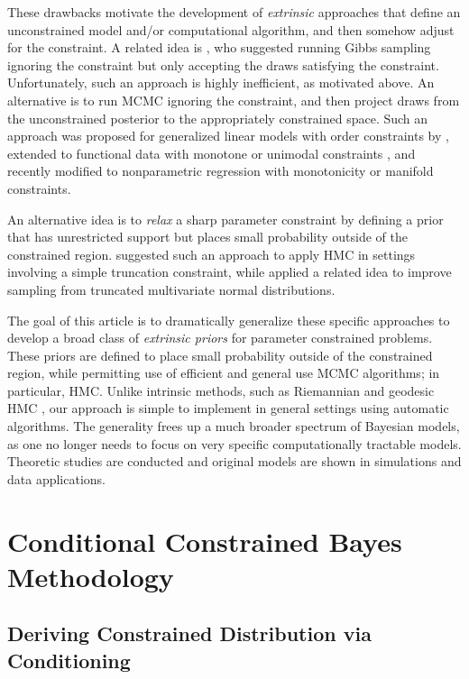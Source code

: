 \documentclass[10pt]{article}
\DeclareMathOperator{\1}{\mathbbm{1}}
\begin{document}
These drawbacks motivate the development of {\em extrinsic} approaches that define an unconstrained model and/or computational algorithm, and then somehow adjust for the constraint. A related idea is \cite{gelfand1992bayesian}, who suggested running Gibbs sampling ignoring the constraint but only accepting the draws satisfying the constraint. Unfortunately, such an approach is highly inefficient, as motivated above. An alternative is to run MCMC ignoring the constraint, and then project draws from the unconstrained posterior to the appropriately constrained space. Such an approach was proposed for generalized linear models with order constraints by \cite{dunson2003bayesian}, extended to functional data with monotone or unimodal constraints \citep{gunn2005transformation}, and recently modified to nonparametric regression with monotonicity \citep{lin2014monogp} or manifold \citep{lin2016extrinsic} constraints.

An alternative idea is to {\em relax} a sharp parameter constraint by defining a prior that has unrestricted support but places small probability outside of the constrained region. \cite{neal2011mcmc} suggested such an approach to apply HMC in settings involving a simple truncation constraint, while \cite{pakman2014exact} applied a related idea to improve sampling from truncated multivariate normal distributions.

The goal of this article is to dramatically generalize these specific approaches to develop a broad class of {\em extrinsic priors} for parameter constrained problems. These priors are defined to place small probability outside of the constrained region, while permitting use of efficient and general use MCMC algorithms; in particular, HMC. Unlike intrinsic methods, such as Riemannian and geodesic HMC \citep{girolami2011riemann,byrne2013geodesic}, our approach is simple to implement in general settings using automatic algorithms. The generality frees up a much broader spectrum of Bayesian models, as one no longer needs to focus on very specific computationally tractable models.
Theoretic studies are conducted and original models are shown in simulations and data applications.

\section{Conditional Constrained Bayes Methodology}

\subsection{Deriving Constrained Distribution via Conditioning}
\end{document}
